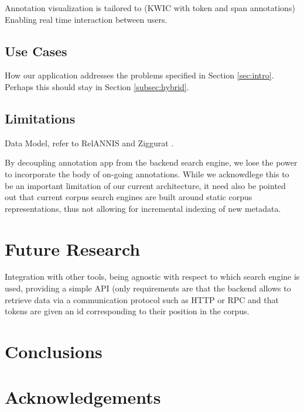 \documentclass{sig-alternate}
\begin{document}
Annotation visualization is tailored to (KWIC with token and span annotations)
Enabling real time interaction between users. 

\subsection{Use Cases}
How our application addresses the problems specified in Section \ref{sec:intro}. Perhaps this
should stay in Section \ref{subsec:hybrid}.

\subsection{Limitations}
Data Model, refer to RelANNIS and Ziggurat \cite{Krause2016,Evert2015}.

By decoupling annotation app from the backend search engine, we lose the power to incorporate
the body of on-going annotations.
While we acknowdlege this to be an important limitation of our current architecture, it need
also be pointed out that current corpus search engines are built around static corpus
representations, thus not allowing for incremental indexing of new metadata.

\section{Future Research}\label{sec:future}
Integration with other tools, being agnostic with respect to which search engine is used,
providing a simple API (only requirements are that the backend allows to retrieve data via
a communication protocol such as HTTP or RPC and that tokens are given an id corresponding
to their position in the corpus.


\section{Conclusions}\label{sec:conclusion}

\section{Acknowledgements}



%
%

\end{document}
